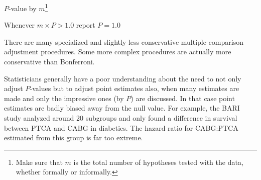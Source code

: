   $P$-value by $m$\footnote{Make sure that $m$ is the total number of
    hypotheses tested with the data, whether formally or informally.}
\item Whenever $m \times P > 1.0$ report $P=1.0$
\item There are many specialized and slightly less conservative
  multiple comparison adjustment procedures.  Some more complex
  procedures are actually more conservative than Bonferroni.
\item Statisticians generally have a poor understanding about the need
  to not only adjust $P$-values but to adjust point estimates also,
  when many estimates are made and only the impressive ones (by $P$)
  are discussed.  In that case point estimates are badly biased away
  from the null value.  For example, the BARI study analyzed around 20
  subgroups and only found a difference in survival between PTCA and
  CABG in diabetics.  The hazard ratio for CABG:PTCA estimated from
  this group is far too extreme.
\ei
